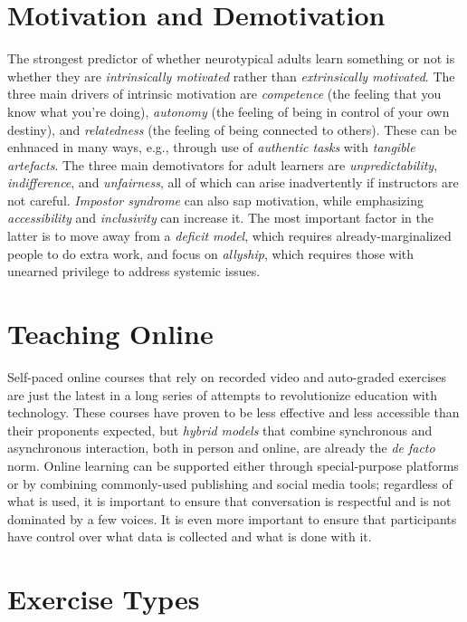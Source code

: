 \documentclass{article}
\begin{document}
\section{Motivation and Demotivation}

The strongest predictor of whether neurotypical adults learn something or not
is whether they are \emph{intrinsically motivated} rather than \emph{extrinsically motivated}.
The three main drivers of intrinsic motivation are
\emph{competence} (the feeling that you know what you're doing),
\emph{autonomy} (the feeling of being in control of your own destiny),
and \emph{relatedness} (the feeling of being connected to others).
These can be enhnaced in many ways,
e.g., through use of \emph{authentic tasks} with \emph{tangible artefacts}.
The three main demotivators for adult learners are \emph{unpredictability},
\emph{indifference},
and \emph{unfairness},
all of which can arise inadvertently if instructors are not careful.
\emph{Impostor syndrome} can also sap motivation,
while emphasizing \emph{accessibility} and \emph{inclusivity} can increase it.
The most important factor in the latter is to move away from a \emph{deficit model},
which requires already-marginalized people to do extra work,
and focus on \emph{allyship},
which requires those with unearned privilege to address systemic issues.

\section{Teaching Online}

Self-paced online courses that rely on recorded video and auto-graded exercises
are just the latest in a long series of attempts to revolutionize education with technology.
These courses have proven to be less effective and less accessible than their proponents expected,
but \emph{hybrid models} that combine synchronous and asynchronous interaction,
both in person and online,
are already the \emph{de facto} norm.
Online learning can be supported either through special-purpose platforms
or by combining commonly-used publishing and social media tools;
regardless of what is used,
it is important to ensure that conversation is respectful and is not dominated by a few voices.
It is even more important to ensure that participants have control over
what data is collected and what is done with it.

\section{Exercise Types}
\end{document}
